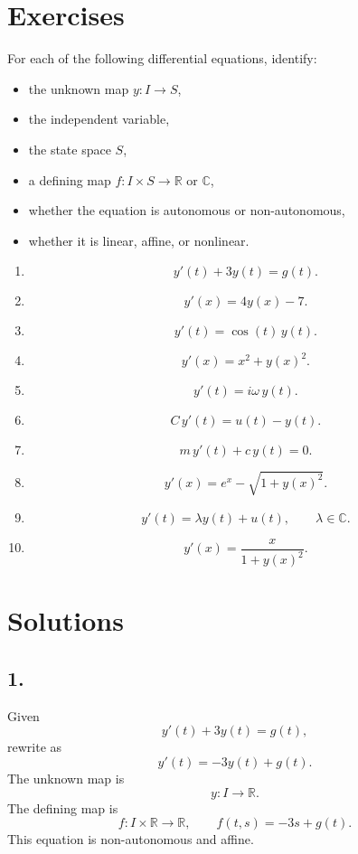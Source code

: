 \documentclass[12pt]{article}
\begin{document}
	\section*{Exercises}
	
	For each of the following differential equations, identify:
	\begin{itemize}
		\item the unknown map \(y:I\to S\),
		\item the independent variable,
		\item the state space \(S\),
		\item a defining map \(f:I\times S\to\mathbb{R}\) or \(\mathbb{C}\),
		\item whether the equation is autonomous or non-autonomous,
		\item whether it is linear, affine, or nonlinear.
	\end{itemize}
	
	\begin{enumerate}
		\item
		$$
		y'(t)+3y(t)=g(t).
		$$
		
		\item
		$$
		y'(x)=4y(x)-7.
		$$
		
		\item
		$$
		y'(t)=\cos(t)\,y(t).
		$$
		
		\item
		$$
		y'(x)=x^2+y(x)^2.
		$$
		
		\item
		$$
		y'(t)=i\omega\,y(t).
		$$
		
		\item
		$$
		C\,y'(t)=u(t)-y(t).
		$$
		
		\item
		$$
		m\,y'(t)+c\,y(t)=0.
		$$
		
		\item
		$$
		y'(x)=e^x-\sqrt{1+y(x)^2}.
		$$
		
		\item
		$$
		y'(t)=\lambda y(t)+u(t),
		\qquad \lambda\in\mathbb{C}.
		$$
		
		\item
		$$
		y'(x)=\frac{x}{1+y(x)^2}.
		$$
	\end{enumerate}
	
	\section*{Solutions}
	
	\subsection*{1.}
	Given
	$$
	y'(t)+3y(t)=g(t),
	$$
	rewrite as
	$$
	y'(t)=-3y(t)+g(t).
	$$
	The unknown map is
	$$
	y:I\to\mathbb{R}.
	$$
	The defining map is
	$$
	f:I\times\mathbb{R}\to\mathbb{R},
	\qquad
	f(t,s)=-3s+g(t).
	$$
	This equation is non-autonomous and affine.
	
\end{document}
